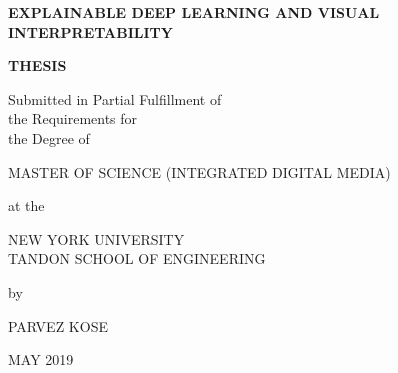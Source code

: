 
\renewcommand\arraystretch{2.5}
\captionsetup{singlelinecheck=false, font=blue, labelfont=sc, labelsep=quad}

\newcommand{\thesistitle}{EXPLAINABLE DEEP LEARNING AND VISUAL INTERPRETABILITY}
\newcommand{\thesisauthor}{PARVEZ KOSE}
\newcommand{\thesisadvisor}{Gene Kogan}
\newcommand{\graddate}{MAY 2019} %

\thispagestyle{empty}
\begin{center}
{\bfseries 
  {\large\thesistitle}
  \vspace{1in}
  
 {\large {\bf THESIS}}\\
  \vspace{.5in}
  
  \begin{doublespace}
  {\large  
  Submitted in Partial Fulfillment of\\
  the Requirements for\\
  the Degree of\\}
  \end{doublespace}
  \vspace{.5in}
  
  {\large MASTER OF SCIENCE (INTEGRATED DIGITAL MEDIA)}\\
  \vspace{.5in}
  
  at the \\
  \vspace{.2in}
  
  {\large
  NEW YORK UNIVERSITY\\
  \vspace{0.05in}
  TANDON SCHOOL OF ENGINEERING\\
  }
  \vspace{.2in}
  
  by
  \vspace{.5in}

  {\large\thesisauthor}
  \vspace{.5in}

  {\large\graddate}
}

\end{center}
